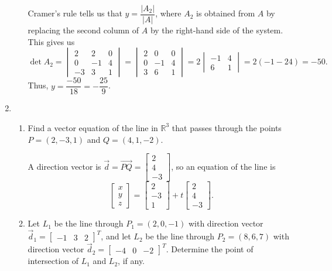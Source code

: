 \documentclass[12pt]{article}
\newcommand{\points}[1]{\marginpar{\hspace{24pt}[#1]}}
\newcommand{\R}{\mathbb{R}}
\newcommand{\abs}[1]{\lvert #1\rvert}
\begin{document}
\begin{enumerate}
\begin{enumerate}
Cramer's rule tells us that $y = \dfrac{\abs{A_2}}{\abs{A}}$, where $A_2$ is obtained from $A$ by replacing the second column of $A$ by the right-hand side of the system. This gives us
\[
 \det{A_2} = \begin{vmatrix}2&2&0\\0&-1&4\\-3&3&1\end{vmatrix} = \begin{vmatrix}2&0&0\\0&-1&4\\3&6&1\end{vmatrix} = 2\begin{vmatrix}-1&4\\6&1\end{vmatrix} = 2(-1-24)=-50.
\]
Thus, $y=\dfrac{-50}{18} = -\dfrac{25}{9}$.
\end{enumerate}


\newpage

\item \begin{enumerate}
       \item Find a vector equation of the line in $\R^3$ that passes through the points $P=(2,-3,1)$ and $Q=(4,1,-2)$. \points{4}

\bigskip

A direction vector is $\vec{d} = \overrightarrow{PQ} = \begin{bmatrix} 2\\4\\-3\end{bmatrix}$, so an equation of the line is
\[
 \begin{bmatrix}x\\y\\z\end{bmatrix} = \begin{bmatrix}2\\-3\\1\end{bmatrix}+t\begin{bmatrix}2\\4\\-3\end{bmatrix}.
\]

\bigskip

       \item Let $L_1$ be the line through $P_1=(2,0,-1)$ with direction vector $\vec{d}_1 = \begin{bmatrix}-1&3&2\end{bmatrix}^T$, and let $L_2$ be the line through $P_2=(8,6,7)$ with direction vector $\vec{d}_2=\begin{bmatrix}-4&0&-2\end{bmatrix}^T$. Determine the point of intersection of $L_1$ and $L_2$, if any.\points{6}


\end{enumerate}
\end{enumerate}
\end{document}
